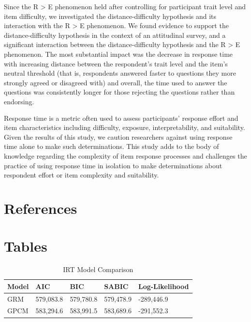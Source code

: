 \documentclass[
  number]{elsarticle}
\begin{document}
Since the R \textgreater{} E phenomenon held after controlling for
participant trait level and item difficulty, we investigated the
distance-difficulty hypothesis and its interaction with the R
\textgreater{} E phenomenon. We found evidence to support the
distance-difficulty hypothesis in the context of an attitudinal survey,
and a significant interaction between the distance-difficulty hypothesis
and the R \textgreater{} E phenomenon. The most substantial impact was
the decrease in response time with increasing distance between the
respondent's trait level and the item's neutral threshold (that is,
respondents answered faster to questions they more strongly agreed or
disagreed with) and overall, the time used to answer the questions was
consistently longer for those rejecting the questions rather than
endorsing.

Response time is a metric often used to assess participants' response
effort and item characteristics including difficulty, exposure,
interpretability, and suitability. Given the results of this study, we
caution researchers against using response time alone to make such
determinations. This study adds to the body of knowledge regarding the
complexity of item response processes and challenges the practice of
using response time in isolation to make determinations about respondent
effort or item complexity and suitability.

\section*{References}\label{references}

\renewcommand{\bibsection}{}


\section*{Tables}\label{tables}

\begin{longtable}[]{@{}lllll@{}}

\caption{\label{tbl-Table1}IRT Model Comparison}

\tabularnewline

\toprule\noalign{}
Model & AIC & BIC & SABIC & Log-Likelihood \\
\midrule\noalign{}
\endhead
\bottomrule\noalign{}
\endlastfoot
GRM & 579,083.8 & 579,780.8 & 579,478.9 & -289,446.9 \\
GPCM & 583,294.6 & 583,991.5 & 583,689.6 & -291,552.3 \\

\end{longtable}
\end{document}
